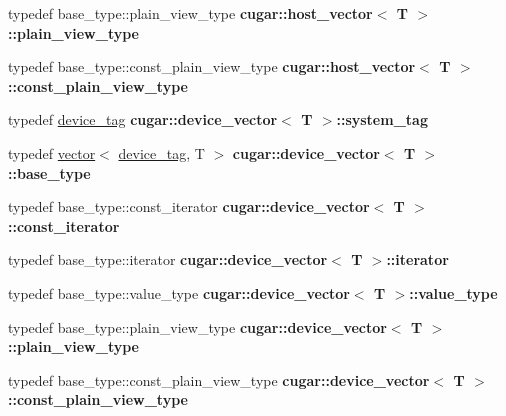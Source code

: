 \begin{DoxyCompactItemize}
typedef base\+\_\+type\+::plain\+\_\+view\+\_\+type {\bfseries cugar\+::host\+\_\+vector$<$ T $>$\+::plain\+\_\+view\+\_\+type}
\item 
\mbox{\label{group___basic_gae81ae4b8018ea5ad5dc3cf252ac045ac}} 
typedef base\+\_\+type\+::const\+\_\+plain\+\_\+view\+\_\+type {\bfseries cugar\+::host\+\_\+vector$<$ T $>$\+::const\+\_\+plain\+\_\+view\+\_\+type}
\item 
\mbox{\label{group___basic_ga43f41f9f620539531e2517196f609ae0}} 
typedef \hyperlink{structcugar_1_1device__tag}{device\+\_\+tag} {\bfseries cugar\+::device\+\_\+vector$<$ T $>$\+::system\+\_\+tag}
\item 
\mbox{\label{group___basic_ga6bb1d25af2fa45ccaf62b8c5ed47beb8}} 
typedef \hyperlink{structcugar_1_1vector}{vector}$<$ \hyperlink{structcugar_1_1device__tag}{device\+\_\+tag}, T $>$ {\bfseries cugar\+::device\+\_\+vector$<$ T $>$\+::base\+\_\+type}
\item 
\mbox{\label{group___basic_ga924fbbdd25f1376d9714ce0b956f497e}} 
typedef base\+\_\+type\+::const\+\_\+iterator {\bfseries cugar\+::device\+\_\+vector$<$ T $>$\+::const\+\_\+iterator}
\item 
\mbox{\label{group___basic_ga604ca759ef2b2a10bdce280c6f3ec1cf}} 
typedef base\+\_\+type\+::iterator {\bfseries cugar\+::device\+\_\+vector$<$ T $>$\+::iterator}
\item 
\mbox{\label{group___basic_gab8cf9ddbbb8d8ee73acedf151ce72e30}} 
typedef base\+\_\+type\+::value\+\_\+type {\bfseries cugar\+::device\+\_\+vector$<$ T $>$\+::value\+\_\+type}
\item 
\mbox{\label{group___basic_ga5fa522307d0b3d1e49cbc541d567fcdc}} 
typedef base\+\_\+type\+::plain\+\_\+view\+\_\+type {\bfseries cugar\+::device\+\_\+vector$<$ T $>$\+::plain\+\_\+view\+\_\+type}
\item 
\mbox{\label{group___basic_gac50c5068d4391df71a91a00b7c45ab45}} 
typedef base\+\_\+type\+::const\+\_\+plain\+\_\+view\+\_\+type {\bfseries cugar\+::device\+\_\+vector$<$ T $>$\+::const\+\_\+plain\+\_\+view\+\_\+type}
\item 

\end{DoxyCompactItemize}
